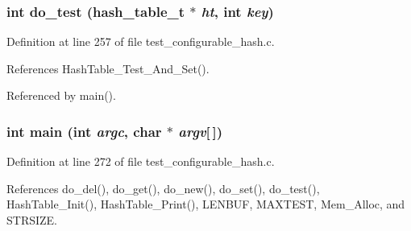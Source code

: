 \subsubsection{\setlength{\rightskip}{0pt plus 5cm}int do\_\-test (hash\_\-table\_\-t $\ast$ {\em ht}, int {\em key})}\label{test__configurable__hash_8c_a20}




Definition at line 257 of file test\_\-configurable\_\-hash.c.

References Hash\-Table\_\-Test\_\-And\_\-Set().

Referenced by main().
\subsubsection{\setlength{\rightskip}{0pt plus 5cm}int main (int {\em argc}, char $\ast$ {\em argv}[$\,$])}\label{test__configurable__hash_8c_a21}




Definition at line 272 of file test\_\-configurable\_\-hash.c.

References do\_\-del(), do\_\-get(), do\_\-new(), do\_\-set(), do\_\-test(), Hash\-Table\_\-Init(), Hash\-Table\_\-Print(), LENBUF, MAXTEST, Mem\_\-Alloc, and STRSIZE.